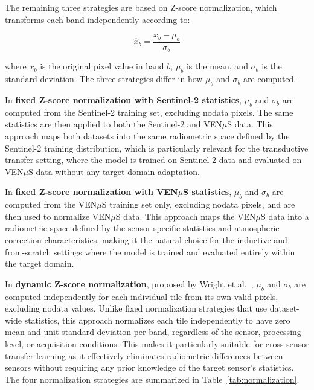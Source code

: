 The remaining three strategies are based on Z-score normalization, which transforms each band independently according to:

\begin{equation}
\hat{x}_b = \frac{x_b - \mu_b}{\sigma_b}
\label{eq:zscore}
\end{equation}

where $x_b$ is the original pixel value in band $b$, $\mu_b$ is the mean, and $\sigma_b$ is the standard deviation. The three strategies differ in how $\mu_b$ and $\sigma_b$ are computed.

In \textbf{fixed Z-score normalization with Sentinel-2 statistics}, $\mu_b$ and $\sigma_b$ are computed from the Sentinel-2 training set, excluding nodata pixels. The same statistics are then applied to both the Sentinel-2 and VEN$\mu$S data. This approach maps both datasets into the same radiometric space defined by the Sentinel-2 training distribution, which is particularly relevant for the transductive transfer setting, where the model is trained on Sentinel-2 data and evaluated on VEN$\mu$S data without any target domain adaptation.

In \textbf{fixed Z-score normalization with VEN$\mu$S statistics}, $\mu_b$ and $\sigma_b$ are computed from the VEN$\mu$S training set only, excluding nodata pixels, and are then used to normalize VEN$\mu$S data. This approach maps the VEN$\mu$S data into a radiometric space defined by the sensor-specific statistics and atmospheric correction characteristics, making it the natural choice for the inductive and from-scratch settings where the model is trained and evaluated entirely within the target domain.

In \textbf{dynamic Z-score normalization}, proposed by Wright et al.\ \cite{wright2025}, $\mu_b$ and $\sigma_b$ are computed independently for each individual tile from its own valid pixels, excluding nodata values. Unlike fixed normalization strategies that use dataset-wide statistics, this approach normalizes each tile independently to have zero mean and unit standard deviation per band, regardless of the sensor, processing level, or acquisition conditions. This makes it particularly suitable for cross-sensor transfer learning as it effectively eliminates radiometric differences between sensors without requiring any prior knowledge of the target sensor's statistics. The four normalization strategies are summarized in Table~\ref{tab:normalization}.


